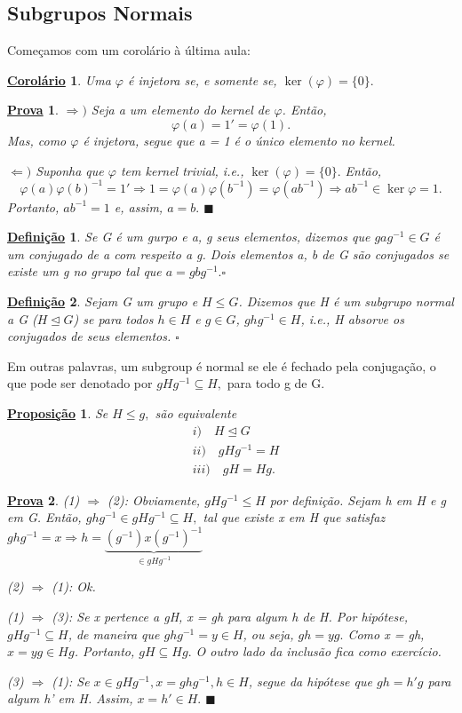 \documentclass{article}
\newtheorem*{def*}{\underline{Defini\c c\~ao}}
\newtheorem*{prop*}{\underline{Proposi\c c\~ao}}
\newtheorem*{crl*}{\underline{Corol\'ario}}
\newtheorem*{proof*}{\underline{Prova}}
\renewcommand\qedsymbol{$\blacksquare$}
\begin{document}
\subsection{Subgrupos Normais}
  Come\c camos com um corol\'ario \`a \'ultima aula:
 \begin{crl*}
   Uma $\varphi$ \'e injetora se, e somente se, $\ker{(\varphi)} =\{0\}.$
 \end{crl*}
\begin{proof*}
  $ \Rightarrow)$ Seja a um elemento do kernel de $\varphi$. Ent\~ao, 
    $$
      \varphi(a) = 1' = \varphi(1).
    $$
    Mas, como $\varphi$ \'e injetora, segue que a = 1 \'e o \'unico elemento no kernel.

  $ \Leftarrow)$ Suponha que $\varphi$ tem kernel trivial, i.e., $\ker{(\varphi)} =\{0\}.$ Ent\~ao,
    $$
    \varphi(a)\varphi(b)^{-1} = 1' \Rightarrow 1 = \varphi(a)\varphi(b^{-1}) = \varphi(ab^{-1}) \Rightarrow ab^{-1}\in\ker{\varphi} = {1}.
    $$
    Portanto, $ab^{-1} = 1$ e, assim, $a = b.$ \qedsymbol
\end{proof*}
 \begin{def*}
   Se G \'e um gurpo e a, g seus elementos, dizemos que $gag^{-1}\in G$ \'e um conjugado de a com respeito a g. Dois elementos a, b
  de G s\~ao conjugados se existe um g no grupo tal que $a = g b g^{-1}.\square$
 \end{def*}
 \begin{def*}
   Sejam G um grupo e $H\leq{G}$. Dizemos que H \'e um subgrupo normal a G ($H\trianglelefteq G$) se para todos $h\in H$ e $g\in G$,
  $ghg^{-1}\in H$, i.e., H absorve os conjugados de seus elementos. $\square$
 \end{def*}
  Em outras palavras, um subgroup \'e normal se ele \'e fechado pela conjuga\c c\~ao, o que pode ser denotado por $gHg^{-1}\subseteq{H},$ para todo
g de G.
 \begin{prop*}
   Se $H\leq{g},$ s\~ao equivalente
  \begin{align*}
    &i)\quad H\trianglelefteq{G} \\
    &ii)\quad gHg^{-1} = H\\
    &iii)\quad gH = Hg.
  \end{align*}
 \end{prop*}
\begin{proof*}
  (1) $ \Rightarrow$ (2): Obviamente, $gHg^{-1}\leq{H}$ por defini\c c\~ao. Sejam h em H e g em G. Ent\~ao, $ghg^{-1}\in gHg^{-1}\subseteq{H},$
  tal que existe x em H que satisfaz $ghg^{-1} = x \Rightarrow h = \underbrace{(g^{-1})x(g^{-1})^{-1}}_{\in gHg^{-1}}$

  (2) $ \Rightarrow$ (1): Ok.

  (1) $ \Rightarrow$ (3): Se x pertence a gH, x = gh para algum h de H. Por hip\'otese, $gHg^{-1}\subseteq{H}$, de maneira que
 $ghg^{-1} = y\in H$, ou seja, $gh = yg.$ Como x = gh, $x = yg\in Hg$. Portanto, $gH\subseteq{Hg}.$ O outro lado da inclus\~ao fica como exerc\'icio.

  (3) $\Rightarrow$ (1): Se $x\in gHg^{-1}, x = ghg^{-1}, h\in H$, segue da hip\'otese que $gh = h'g$ para algum h' em H. Assim,
  $x = h'\in H.$ \qedsymbol
\end{proof*}
\end{document}
